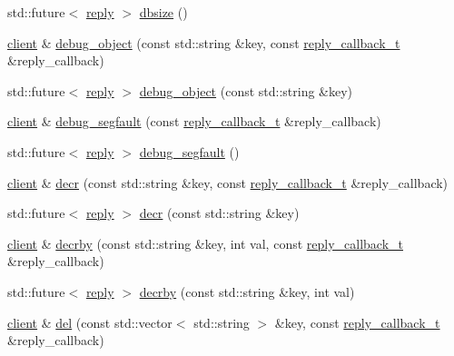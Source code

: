 \begin{DoxyCompactItemize}
\item 
std\+::future$<$ \hyperlink{classcpp__redis_1_1reply}{reply} $>$ \hyperlink{classcpp__redis_1_1client_aa9169c3c4a8b3ec5ee7b7bc601ae8a52}{dbsize} ()
\item 
\hyperlink{classcpp__redis_1_1client}{client} \& \hyperlink{classcpp__redis_1_1client_ad96e4d369e87e858fd7a8296b5cc378e}{debug\+\_\+object} (const std\+::string \&key, const \hyperlink{classcpp__redis_1_1client_a061a1140d36d2eaeda82b09a0bb3f9f2}{reply\+\_\+callback\+\_\+t} \&reply\+\_\+callback)
\item 
std\+::future$<$ \hyperlink{classcpp__redis_1_1reply}{reply} $>$ \hyperlink{classcpp__redis_1_1client_a9d7a2eae091f99db6b5479577de0bf99}{debug\+\_\+object} (const std\+::string \&key)
\item 
\hyperlink{classcpp__redis_1_1client}{client} \& \hyperlink{classcpp__redis_1_1client_ac5d06ca1072ef1a83a8843c448e4d1e3}{debug\+\_\+segfault} (const \hyperlink{classcpp__redis_1_1client_a061a1140d36d2eaeda82b09a0bb3f9f2}{reply\+\_\+callback\+\_\+t} \&reply\+\_\+callback)
\item 
std\+::future$<$ \hyperlink{classcpp__redis_1_1reply}{reply} $>$ \hyperlink{classcpp__redis_1_1client_a764786e7003c538a6cf0a5d6b44d66dd}{debug\+\_\+segfault} ()
\item 
\hyperlink{classcpp__redis_1_1client}{client} \& \hyperlink{classcpp__redis_1_1client_a8e09d5753d9f9ba00b1d5e8aed306189}{decr} (const std\+::string \&key, const \hyperlink{classcpp__redis_1_1client_a061a1140d36d2eaeda82b09a0bb3f9f2}{reply\+\_\+callback\+\_\+t} \&reply\+\_\+callback)
\item 
std\+::future$<$ \hyperlink{classcpp__redis_1_1reply}{reply} $>$ \hyperlink{classcpp__redis_1_1client_ac80abd9a238a7613294d4444bbc92907}{decr} (const std\+::string \&key)
\item 
\hyperlink{classcpp__redis_1_1client}{client} \& \hyperlink{classcpp__redis_1_1client_aaa45a662abeaa66f5a8c985cd27957c8}{decrby} (const std\+::string \&key, int val, const \hyperlink{classcpp__redis_1_1client_a061a1140d36d2eaeda82b09a0bb3f9f2}{reply\+\_\+callback\+\_\+t} \&reply\+\_\+callback)
\item 
std\+::future$<$ \hyperlink{classcpp__redis_1_1reply}{reply} $>$ \hyperlink{classcpp__redis_1_1client_ac4fe81368d7f9cc305811d8346e60881}{decrby} (const std\+::string \&key, int val)
\item 
\hyperlink{classcpp__redis_1_1client}{client} \& \hyperlink{classcpp__redis_1_1client_a29a5307b20d9ffe951e2ff302797a296}{del} (const std\+::vector$<$ std\+::string $>$ \&key, const \hyperlink{classcpp__redis_1_1client_a061a1140d36d2eaeda82b09a0bb3f9f2}{reply\+\_\+callback\+\_\+t} \&reply\+\_\+callback)

\end{DoxyCompactItemize}
